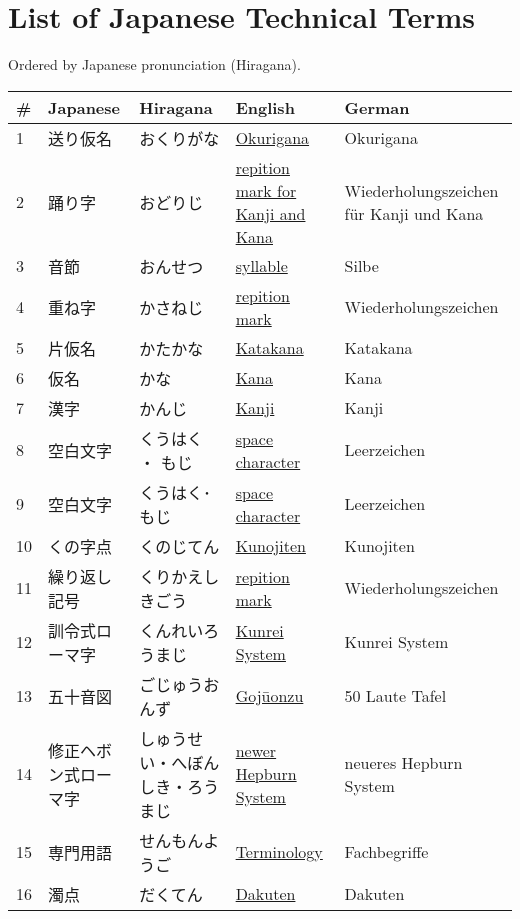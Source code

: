 \chapter{List of Japanese Technical Terms}
\label{chap:ListOfJapaneseTechnicalTerms}
\label{sec:JapaneseTechnicalTerms}
\normalsize Ordered by Japanese pronunciation (Hiragana).
\footnotesize\Padding
\begin{longtable}[c]{p{.5cm}p{3.5cm}p{4cm}p{3.5cm}p{3.5cm}}
\textbf{\#}&\textbf{Japanese}&\textbf{Hiragana}&\textbf{English}&\textbf{German}\\ \hline
1&送り仮名&おくりがな&\hyperref[sec:Okurigana]{Okurigana}&Okurigana\\
2&踊り字&おどりじ&\hyperref[sec:RepitionMarkForKanjiAndKana]{repition mark for Kanji and Kana}&Wiederholungszeichen für Kanji und Kana\\
3&音節&おんせつ&\hyperref[sec:Syllable]{syllable}&Silbe\\
4&重ね字&かさねじ&\hyperref[sec:RepitionMark]{repition mark}&Wiederholungszeichen\\
5&片仮名&かたかな&\hyperref[sec:Katakana]{Katakana}&Katakana\\
6&仮名&かな&\hyperref[sec:Kana]{Kana}&Kana\\
7&漢字&かんじ&\hyperref[sec:Kanji]{Kanji}&Kanji\\
8&空白文字&くうはく ・ もじ&\hyperref[sec:SpaceCharacter]{space character}&Leerzeichen\\
9&空白文字&くうはく･もじ&\hyperref[sec:SpaceCharacter]{space character}&Leerzeichen\\
10&くの字点&くのじてん&\hyperref[sec:Kunojiten]{Kunojiten}&Kunojiten\\
11&繰り返し記号&くりかえしきごう&\hyperref[sec:RepitionMark]{repition mark}&Wiederholungszeichen\\
12&訓令式ローマ字&くんれいろうまじ&\hyperref[sec:KunreiSystem]{Kunrei System}&Kunrei System\\
13&五十音図&ごじゅうおんず&\hyperref[sec:Gojuonzu]{Gojūonzu}&50 Laute Tafel\\
14&修正ヘボン式ローマ字&しゅうせい・へぼんしき・ろうまじ&\hyperref[sec:NewerHepburnSystem]{newer Hepburn System}&neueres Hepburn System\\
15&専門用語&せんもんようご&\hyperref[sec:Terminology]{Terminology}&Fachbegriffe\\
16&濁点&だくてん&\hyperref[sec:Dakuten]{Dakuten}&Dakuten\\

\end{longtable}
